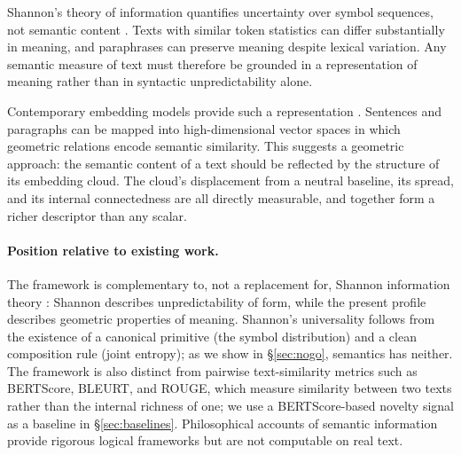 \documentclass[11pt]{article}
\begin{document}
Shannon's theory of information quantifies uncertainty over symbol sequences, not semantic content \cite{shannon1948}. Texts with similar token statistics can differ substantially in meaning, and paraphrases can preserve meaning despite lexical variation. Any semantic measure of text must therefore be grounded in a representation of meaning rather than in syntactic unpredictability alone.

Contemporary embedding models provide such a representation \cite{mikolov2013, reimers2019}. Sentences and paragraphs can be mapped into high-dimensional vector spaces in which geometric relations encode semantic similarity. This suggests a geometric approach: the semantic content of a text should be reflected by the structure of its embedding cloud. The cloud's displacement from a neutral baseline, its spread, and its internal connectedness are all directly measurable, and together form a richer descriptor than any scalar.

\paragraph{Position relative to existing work.} The framework is complementary to, not a replacement for, Shannon information theory \cite{shannon1948}: Shannon describes unpredictability of form, while the present profile describes geometric properties of meaning. Shannon's universality follows from the existence of a canonical primitive (the symbol distribution) and a clean composition rule (joint entropy); as we show in \S\ref{sec:nogo}, semantics has neither. The framework is also distinct from pairwise text-similarity metrics such as BERTScore, BLEURT, and ROUGE, which measure similarity between two texts rather than the internal richness of one; we use a BERTScore-based novelty signal as a baseline in \S\ref{sec:baselines}. Philosophical accounts of semantic information \cite{barhillel1952, dretske1981, floridi2011, barwise1997} provide rigorous logical frameworks but are not computable on real text.
\end{document}
